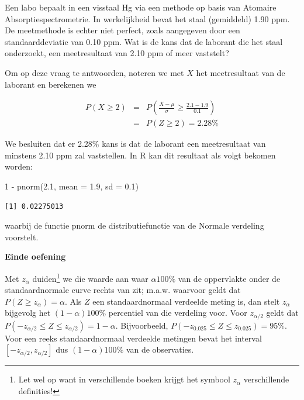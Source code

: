 \documentclass[
  dutch,
  letterpaper,
  12pt]{book}
\newenvironment{Shaded}{\begin{snugshade}}{\end{snugshade}}
\newcommand{\AttributeTok}[1]{\textcolor[rgb]{0.40,0.45,0.13}{#1}}
\newcommand{\DecValTok}[1]{\textcolor[rgb]{0.68,0.00,0.00}{#1}}
\newcommand{\FloatTok}[1]{\textcolor[rgb]{0.68,0.00,0.00}{#1}}
\newcommand{\FunctionTok}[1]{\textcolor[rgb]{0.28,0.35,0.67}{#1}}
\newcommand{\NormalTok}[1]{\textcolor[rgb]{0.00,0.23,0.31}{#1}}
\newcommand{\SpecialCharTok}[1]{\textcolor[rgb]{0.37,0.37,0.37}{#1}}
\theoremstyle{definition}
\theoremstyle{definition}
\theoremstyle{definition}
\theoremstyle{remark}
\begin{document}
Een labo bepaalt in een visstaal Hg via een methode op basis van
Atomaire Absorptiespectrometrie. In werkelijkheid bevat het staal
(gemiddeld) 1.90 ppm. De meetmethode is echter niet perfect, zoals
aangegeven door een standaarddeviatie van 0.10 ppm. Wat is de kans dat
de laborant die het staal onderzoekt, een meetresultaat van 2.10 ppm of
meer vaststelt?

Om op deze vraag te antwoorden, noteren we met \(X\) het meetresultaat
van de laborant en berekenen we

\begin{eqnarray*}
P(X\geq 2)&=&P\left(\frac{X-\mu}{\sigma}\geq \frac{2.1-1.9}{0.1}\right) \\
&=&P(Z\geq 2) = 2.28\%
\end{eqnarray*}

We besluiten dat er 2.28\% kans is dat de laborant een meetresultaat van
minstens 2.10 ppm zal vaststellen. In R kan dit resultaat als volgt
bekomen worden:

\begin{Shaded}
\begin{Highlighting}[]
\DecValTok{1} \SpecialCharTok{{-}} \FunctionTok{pnorm}\NormalTok{(}\FloatTok{2.1}\NormalTok{, }\AttributeTok{mean =} \FloatTok{1.9}\NormalTok{, }\AttributeTok{sd =} \FloatTok{0.1}\NormalTok{)}
\end{Highlighting}
\end{Shaded}

\begin{verbatim}
[1] 0.02275013
\end{verbatim}

waarbij de functie pnorm de distributiefunctie van de Normale verdeling
voorstelt.

\textbf{Einde oefening}

Met \(z_{\alpha}\) duiden\footnote{Let wel op want in verschillende
  boeken krijgt het symbool \(z_{\alpha}\) verschillende definities!} we
die waarde aan waar \(\alpha100\%\) van de oppervlakte onder de
standaardnormale curve rechts van zit; m.a.w. waarvoor geldt dat
\(P(Z \geq z_{\alpha}) = \alpha\). Als \(Z\) een standaardnormaal
verdeelde meting is, dan stelt \(z_{\alpha}\) bijgevolg het
\((1-\alpha)100\%\) percentiel van die verdeling voor. Voor
\(z_{\alpha/2}\) geldt dat
\(P(-z_{\alpha/2}\leq Z \leq z_{\alpha/2}) = 1-\alpha\). Bijvoorbeeld,
\(P( -
z_{0.025}\leq Z \leq z_{0.025}) = 95\%\). Voor een reeks
standaardnormaal verdeelde metingen bevat het interval
\([-z_{\alpha/2},z_{\alpha/2}]\) dus \((1-\alpha)100\%\) van de
observaties.
\end{document}
